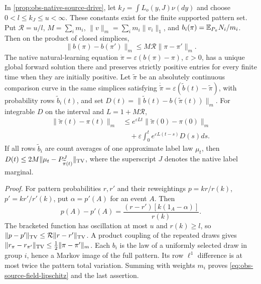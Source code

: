 In \cref{prop:obs-native-source-drive}, let
$k_J=\int L_o(y,J)\nu(dy)$ and choose $0<l\le k_J\le u<\infty$.
These constants exist for the finite supported pattern set. Put
$\mathcal R=u/l$, $M=\sum_i m_i$,
$\|v\|_m=\sum_i m_i\|v_i\|_1$, and
$b_i(\pi)=\mathbb E_{P_\pi}N_i/m_i$. Then on the product of closed simplices,
\begin{equation}
\|b(\pi)-b(\pi')\|_m\le M\mathcal R\|\pi-\pi'\|_m.
\label{eq:obs-source-field-lipschitz}
\end{equation}
The native natural-learning equation
$\dot\pi=\varepsilon(b(\pi)-\pi)$, $\varepsilon>0$, has a unique global
forward solution there and preserves strictly positive entries for every
finite time when they are initially positive. Let $\widetilde\pi$ be an
absolutely continuous comparison curve in the same simplices satisfying
$\dot{\widetilde\pi}=\varepsilon(\widetilde b(t)-\widetilde\pi)$, with
probability rows $\widetilde b_i(t)$, and set
$D(t)=\|\widetilde b(t)-b(\widetilde\pi(t))\|_m$.
For integrable $D$ on the interval and $L=1+M\mathcal R$,
\begin{equation}
\begin{split}
\|\widetilde\pi(t)-\pi(t)\|_m
&\le e^{\varepsilon Lt}\|\widetilde\pi(0)-\pi(0)\|_m\\
&\quad+\varepsilon\int_0^t e^{\varepsilon L(t-s)}D(s)ds.
\end{split}
\label{eq:obs-source-trajectory-error}
\end{equation}
If all rows $\widetilde b_i$ are count averages of one approximate label law
$\mu_t$, then
$D(t)\le2M\|\mu_t-P_{\widetilde\pi(t)}^J\|_{\rm TV}$, where the superscript
$J$ denotes the native label marginal.

\noindent\emph{Proof.}
For pattern probabilities $r,r'$ and their reweightings
$p=kr/r(k)$, $p'=kr'/r'(k)$, put $\alpha=p'(A)$ for an event $A$. Then
\begin{equation}
p(A)-p'(A)=\frac{(r-r')[k(1_A-\alpha)]}{r(k)}.
\end{equation}
The bracketed function has oscillation at most $u$ and $r(k)\ge l$, so
$\|p-p'\|_{\rm TV}\le\mathcal R\|r-r'\|_{\rm TV}$.
A product coupling of the repeated draws gives
$\|r_\pi-r_{\pi'}\|_{\rm TV}\le\tfrac12\|\pi-\pi'\|_m$.
Each $b_i$ is the law of a uniformly selected draw in group $i$, hence a
Markov image of the full pattern. Its row $\ell^1$ difference is at most
twice the pattern total variation. Summing with weights $m_i$ proves
\cref{eq:obs-source-field-lipschitz} and the last assertion.

